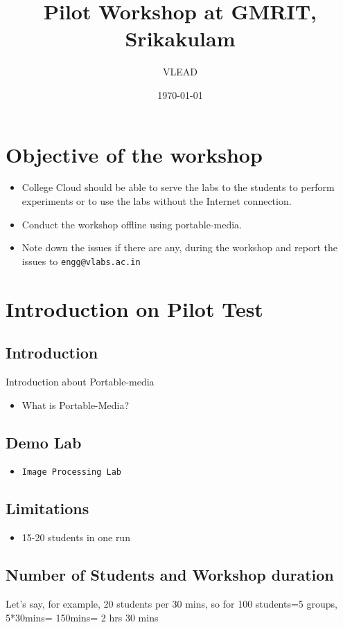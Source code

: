 \documentclass[11pt]{article}
\author{VLEAD}
\date{\today}
\title{Pilot Workshop at GMRIT, Srikakulam}
\begin{document}
\maketitle
\tableofcontents


\section{Objective of the workshop}
\label{sec-1}
\begin{itemize}
\item College Cloud should be able to serve the labs to the students
to perform experiments or to use the labs without the Internet
connection.

\item Conduct the workshop offline using portable-media.

\item Note down the issues if there are any, during the workshop and
report the issues to \texttt{engg@vlabs.ac.in}
\end{itemize}

\section{Introduction on Pilot Test}
\label{sec-2}
\subsection{Introduction}
\label{sec-2-1}
Introduction about Portable-media
\begin{itemize}
\item What is Portable-Media?
\end{itemize}
\subsection{Demo Lab}
\label{sec-2-2}
\begin{itemize}
\item \texttt{Image Processing Lab}
\end{itemize}
\subsection{Limitations}
\label{sec-2-3}
\begin{itemize}
\item 15-20 students in one run
\end{itemize}
\subsection{Number of Students and Workshop duration}
\label{sec-2-4}
Let's say, for example, 20 students per 30 mins, so for 100
students=5 groups, 5*30mins= 150mins= 2 hrs 30 mins
\end{document}
